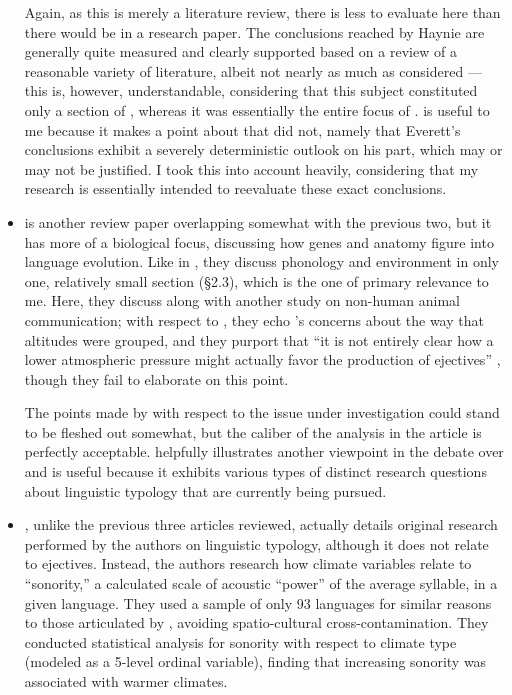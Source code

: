 \documentclass{article}
\begin{document}
\begin{itemize}
Again, as this is merely a literature review, there is less to evaluate here than there would be in a research paper. The conclusions reached by Haynie are generally quite measured and clearly supported based on a review of a reasonable variety of literature, albeit not nearly as much as \textcite{ladd2015} considered --- this is, however, understandable, considering that this subject constituted only a section of \textcite{haynie2014}, whereas it was essentially the entire focus of \textcite{ladd2015}. \textcite{haynie2014} is useful to me because it makes a point about \textcite{everett2013} that \textcite{ladd2015} did not, namely that Everett's conclusions exhibit a severely deterministic outlook on his part, which may or may not be justified. I took this into account heavily, considering that my research is essentially intended to reevaluate these exact conclusions.

\item \textbf{}

\textcite{dediu2017} is another review paper overlapping somewhat with the previous two, but it has more of a biological focus, discussing how genes and anatomy figure into language evolution. Like in \textcite{haynie2014}, they discuss phonology and environment in only one, relatively small section (\S 2.3), which is the one of primary relevance to me. Here, they discuss \textcite{everett2013,everett2015,everett2016} along with another study on non-human animal communication; with respect to \textcite{everett2013}, they echo \textcite{haynie2014}'s concerns about the way that altitudes were grouped, and they purport that ``it is not entirely clear how a lower atmospheric pressure might actually favor the production of ejectives'' \parencite[3]{dediu2017}, though they fail to elaborate on this point.

The points made by \textcite{dediu2017} with respect to the issue under investigation could stand to be fleshed out somewhat, but the caliber of the analysis in the article is perfectly acceptable. \textcite{dediu2017} helpfully illustrates another viewpoint in the debate over \cite{everett2013} and is useful because it exhibits various types of distinct research questions about linguistic typology that are currently being pursued.

\item \textbf{}

\textcite{fought2004}, unlike the previous three articles reviewed, actually details original research performed by the authors on linguistic typology, although it does not relate to ejectives. Instead, the authors research how climate variables relate to ``sonority,'' a calculated scale of acoustic ``power'' of the average syllable, in a given language. They used a sample of only 93 languages for similar reasons to those articulated by \textcite{hammarstroem2013}, avoiding spatio-cultural cross-contamination. They conducted statistical analysis for sonority with respect to climate type (modeled as a 5-level ordinal variable), finding that increasing sonority was associated with warmer climates.


\end{itemize}
\end{document}
